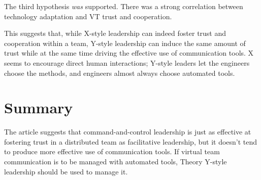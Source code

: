 \documentclass[11pt]{article}
\begin{document}
The third hypothesis \textit{was} supported.  There was a strong correlation between technology
adaptation and VT trust and cooperation.

This suggests that, while X-style leadership can indeed foster trust and cooperation within a team,
Y-style leadership can induce the same amount of trust while at the same time driving the effective
use of communication tools.  X seems to encourage direct human interactions; Y-style leaders let the
engineers choose the methods, and engineers almost always choose automated tools.

\section{Summary}

The article suggests that command-and-control leadership is just as effective at fostering trust in
a distributed team as facilitative leadership, but it doesn't tend to produce more effective use of
communication tools.  If virtual team communication is to be managed with automated tools, Theory
Y-style leadership should be used to manage it.
\end{document}
